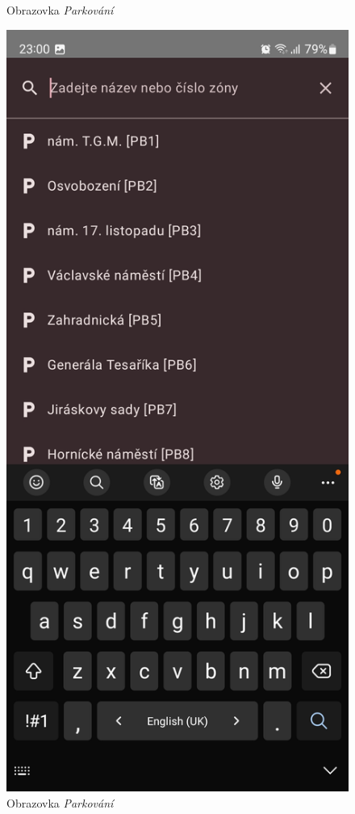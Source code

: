 \begin{figure}[H]
  \caption{Obrazovka \textit{Parkování}}
\endminipage\hfill
{}
  \includegraphics[width=\linewidth]{screens/3c_B.jpg}
  \caption{Obrazovka \textit{Parkování}}
\endminipage\hfill
\end{figure}

